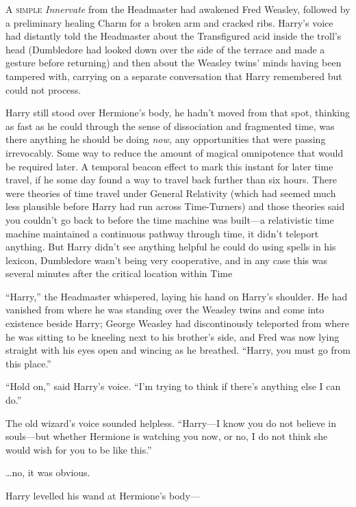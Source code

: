 
\lettrine{A}{ simple}
\emph{Innervate} from the Headmaster had awakened Fred Weasley, followed by a preliminary healing Charm for a broken arm and cracked ribs. Harry’s voice had distantly told the Headmaster about the Transfigured acid inside the troll’s head (Dumbledore had looked down over the side of the terrace and made a gesture before returning) and then about the Weasley twins’ minds having been tampered with, carrying on a separate conversation that Harry remembered but could not process.

Harry still stood over Hermione’s body, he hadn’t moved from that spot, thinking as fast as he could through the sense of dissociation and fragmented time, was there anything he should be doing \emph{now,} any opportunities that were passing irrevocably. Some way to reduce the amount of magical omnipotence that would be required later. A temporal beacon effect to mark this instant for later time travel, if he some day found a way to travel back further than six hours. There were theories of time travel under General Relativity (which had seemed much less plausible before Harry had run across Time-Turners) and those theories said you couldn’t go back to before the time machine was built—a relativistic time machine maintained a continuous pathway through time, it didn’t teleport anything. But Harry didn’t see anything helpful he could do using spells in his lexicon, Dumbledore wasn’t being very cooperative, and in any case this was several minutes after the critical location within Time

“Harry,” the Headmaster whispered, laying his hand on Harry’s shoulder. He had vanished from where he was standing over the Weasley twins and come into existence beside Harry; George Weasley had discontinously teleported from where he was sitting to be kneeling next to his brother’s side, and Fred was now lying straight with his eyes open and wincing as he breathed. “Harry, you must go from this place.”

“Hold on,” said Harry’s voice. “I’m trying to think if there’s anything else I can do.”

The old wizard’s voice sounded helpless. “Harry—I know you do not believe in souls—but whether Hermione is watching you now, or no, I do not think she would wish for you to be like this.”

…no, it was obvious.

Harry levelled his wand at Hermione’s body—

